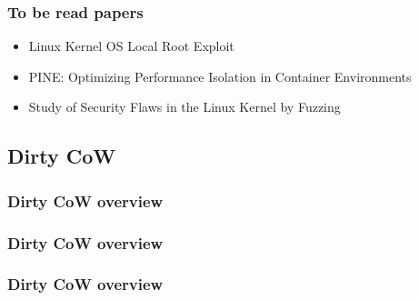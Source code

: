 \documentclass{beamer}
\begin{document}
\begin{frame}
    \frametitle{To be read papers}
    \begin{itemize}
        \item Linux Kernel OS Local Root Exploit\cite{root_exploit}
        \item PINE: Optimizing Performance Isolation in Container Environments\cite{Optimizing}
        \item Study of Security Flaws in the Linux Kernel by Fuzzing\cite{Fuzzing}
    \end{itemize}
\end{frame}

\subsection{Dirty CoW}
\begin{frame}
    \frametitle{Dirty CoW overview}
    
    
\end{frame}

\begin{frame}
    \frametitle{Dirty CoW overview}
    
\end{frame}

\begin{frame}
    \frametitle{Dirty CoW overview}
    
\end{frame}
\end{document}
